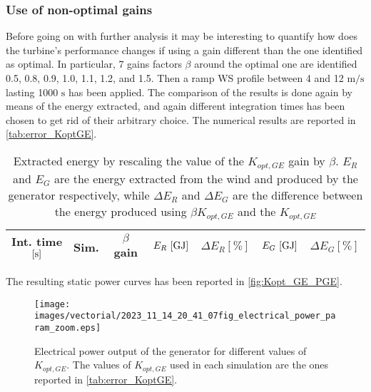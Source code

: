 \subsubsection{Use of non-optimal gains}\label{subsec:c_different_KoptGE}
Before going on with further analysis it may be interesting to quantify how does the turbine's performance changes if using a gain different than the one identified as optimal. In particular, 7 gains factors $\beta$ around the optimal one are identified 0.5, 0.8, 0.9, 1.0, 1.1, 1.2, and 1.5. Then a ramp WS profile between 4 and 12 $\si{\meter\per\second}$ lasting 1000 $\si{\second}$ has been applied. The comparison of the results is done again by means of the energy extracted, and again different integration times has been chosen to get rid of their arbitrary choice. The numerical results are reported in \autoref{tab:error_KoptGE}. 

\begin{table}[htb]
  \caption{Extracted energy by rescaling the value of the $K_{opt,GE}$ gain by $\beta$. $E_R$ and $E_G$ are the energy extracted from the wind and produced by the generator respectively, while $\Delta E_R$ and $\Delta E_G$ are the difference between the energy produced using $\beta K_{opt,GE}$ and the $K_{opt,GE}$}
  \centering
  \begin{tabular}{ccccccc}
  \toprule
  Int. time $\left[\si{\second}\right]$ & Sim. & $\beta$ gain & $E_R \, \left[\si{\giga\joule}\right]$ & $\Delta E_R \left[\%\right]$ & $E_G \, \left[\si{\giga\joule}\right]$ & $\Delta E_G \left[\%\right]$\\ 
   \midrule
  
  \end{tabular}
  \label{tab:error_KoptGE}
\end{table}

The resulting static power curves has been reported in \autoref{fig:Kopt_GE_PGE}.
\begin{figure}
  \centering
  \texttt{[image: images/vectorial/2023\_11\_14\_20\_41\_07fig\_electrical\_power\_param\_zoom.eps]}
  \caption{Electrical power output of the generator for different values of $K_{opt,GE}$. The values of $K_{opt,GE}$ used in each simulation are the ones reported in \autoref{tab:error_KoptGE}.}
  \label{fig:Kopt_GE_PGE}
\end{figure}

